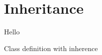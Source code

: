 \chapter{Inheritance}

Hello

\begin{syntaxfloat}
  
  \caption{Class definition with inherence}
  \label{syntax:inheritance:class}
\end{syntaxfloat}
